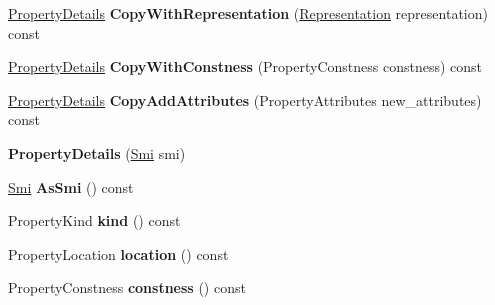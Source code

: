 \begin{DoxyCompactItemize}
\item 
\mbox{\label{classv8_1_1internal_1_1PropertyDetails_af9019cf66ce66e5b72d44cefef51d419}} 
\mbox{\hyperlink{classv8_1_1internal_1_1PropertyDetails}{Property\+Details}} {\bfseries Copy\+With\+Representation} (\mbox{\hyperlink{classv8_1_1internal_1_1Representation}{Representation}} representation) const
\item 
\mbox{\label{classv8_1_1internal_1_1PropertyDetails_a234fe6d21a8a424c1c1b831317e1c2fd}} 
\mbox{\hyperlink{classv8_1_1internal_1_1PropertyDetails}{Property\+Details}} {\bfseries Copy\+With\+Constness} (Property\+Constness constness) const
\item 
\mbox{\label{classv8_1_1internal_1_1PropertyDetails_ac3c702e188d4fb0473c73b73915a399a}} 
\mbox{\hyperlink{classv8_1_1internal_1_1PropertyDetails}{Property\+Details}} {\bfseries Copy\+Add\+Attributes} (Property\+Attributes new\+\_\+attributes) const
\item 
\mbox{\label{classv8_1_1internal_1_1PropertyDetails_a44c5a622037baf0c43597d2914e36bb9}} 
{\bfseries Property\+Details} (\mbox{\hyperlink{classv8_1_1internal_1_1Smi}{Smi}} smi)
\item 
\mbox{\label{classv8_1_1internal_1_1PropertyDetails_ad070c06c0f465353bd654defb3f8a439}} 
\mbox{\hyperlink{classv8_1_1internal_1_1Smi}{Smi}} {\bfseries As\+Smi} () const
\item 
\mbox{\label{classv8_1_1internal_1_1PropertyDetails_a84ec5d54214083de458bfc43b8c3ac1b}} 
Property\+Kind {\bfseries kind} () const
\item 
\mbox{\label{classv8_1_1internal_1_1PropertyDetails_a2d8f536f39a3ab2754cdd721de544ae4}} 
Property\+Location {\bfseries location} () const
\item 
\mbox{\label{classv8_1_1internal_1_1PropertyDetails_aa6d8ec62f0979d0aea956c801aabb815}} 
Property\+Constness {\bfseries constness} () const

\end{DoxyCompactItemize}
